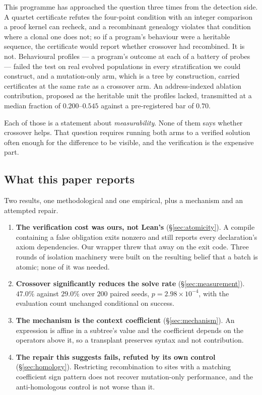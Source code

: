 \documentclass[11pt,a4paper]{article}
\theoremstyle{definition}
\theoremstyle{remark}
\begin{document}
This programme has approached the question three times from the detection side.
A quartet certificate refutes the four-point condition with an integer
comparison a proof kernel can recheck, and a recombinant genealogy violates that
condition where a clonal one does not; so if a program's behaviour were a
heritable sequence, the certificate would report whether crossover had
recombined. It is not. Behavioural profiles --- a program's outcome at each of a
battery of probes --- failed the test on real evolved populations in every
stratification we could construct, and a mutation-only arm, which is a tree by
construction, carried certificates at the same rate as a crossover arm. An
address-indexed ablation contribution, proposed as the heritable unit the
profiles lacked, transmitted at a median fraction of $0.200$--$0.545$ against a
pre-registered bar of $0.70$.

Each of those is a statement about \emph{measurability}. None of them says
whether crossover helps. That question requires running both arms to a verified
solution often enough for the difference to be visible, and the verification is
the expensive part.

\subsection{What this paper reports}

Two results, one methodological and one empirical, plus a mechanism and an
attempted repair.

\begin{enumerate}
\item \textbf{The verification cost was ours, not Lean's} (\S\ref{sec:atomicity}).
A compile containing a false obligation exits nonzero and still reports every
declaration's axiom dependencies. Our wrapper threw that away on the exit code.
Three rounds of isolation machinery were built on the resulting belief that a
batch is atomic; none of it was needed.

\item \textbf{Crossover significantly reduces the solve rate}
(\S\ref{sec:measurement}). $47.0\%$ against $29.0\%$ over $200$ paired seeds,
$p = 2.98\times10^{-4}$, with the evaluation count unchanged conditional on
success.

\item \textbf{The mechanism is the context coefficient}
(\S\ref{sec:mechanism}). An expression is affine in a subtree's value and the
coefficient depends on the operators above it, so a transplant preserves syntax
and not contribution.

\item \textbf{The repair this suggests fails, refuted by its own control}
(\S\ref{sec:homology}). Restricting recombination to sites with a matching
coefficient sign pattern does not recover mutation-only performance, and the
anti-homologous control is not worse than it.
\end{enumerate}
\end{document}
